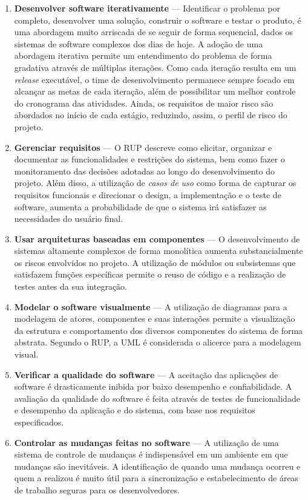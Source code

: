 \documentclass[
  10.5pt,				  %
	openright,			%
	twoside,			  %
  a5paper,
  chapter=TITLE,	%
	section=TITLE,	%
  hyphens,        %
	english,        %
	brazil          %
]{abntex2}
\begin{document}
\begin{enumerate}
\item \textbf{Desenvolver software iterativamente} --- Identificar o problema por completo, desenvolver uma solução, construir o software e testar o produto, é uma abordagem muito arriscada de se seguir de forma sequencial, dados os sistemas de software complexos dos dias de hoje. A adoção de uma abordagem iterativa permite um entendimento do problema de forma gradativa através de múltiplas iterações. Como cada iteração resulta em um \emph{release} executável, o time de desenvolvimento permanece sempre focado em alcançar as metas de cada iteração, além de possibilitar um melhor controle do cronograma das atividades. Ainda, os requisitos de maior risco são abordados no início de cada estágio, reduzindo, assim, o perfil de risco do projeto.

\item \textbf{Gerenciar requisitos} --- O RUP descreve como elicitar, organizar e documentar as funcionalidades e restrições do sistema, bem como fazer o monitoramento das decisões adotadas ao longo do desenvolvimento do projeto. Além disso, a utilização de \emph{casos de uso} como forma de capturar os requisitos funcionais e direcionar o design, a implementação e o teste de software, aumenta a probabilidade de que o sistema irá satisfazer as necessidades do usuário final.

\item \textbf{Usar arquiteturas baseadas em componentes} --- O desenvolvimento de sistemas altamente complexos de forma monolítica aumenta substancialmente os riscos envolvidos no projeto. A utilização de módulos ou subsistemas que satisfazem funções específicas permite o reuso de código e a realização de testes antes da sua integração.

\item \textbf{Modelar o software visualmente} --- A utilização de diagramas para a modelagem de atores, componentes e suas interações permite a visualização da estrutura e comportamento dos diversos componentes do sistema de forma abstrata. Segundo o RUP, a UML é considerada o alicerce para a modelagem visual.

\item \textbf{Verificar a qualidade do software} --- A aceitação das aplicações de software é drasticamente inibida por baixo desempenho e confiabilidade. A avaliação da qualidade do software é feita através de testes de funcionalidade e desempenho da aplicação e do sistema, com base nos requisitos especificados.

\item \textbf{Controlar as mudanças feitas no software} --- A utilização de uma sistema de controle de mudanças é indispensável em um ambiente em que mudanças são inevitáveis. A identificação de quando uma mudança ocorreu e quem a realizou é muito útil para a sincronização e estabelecimento de áreas de trabalho seguras para os desenvolvedores.
\end{enumerate}
\end{document}
